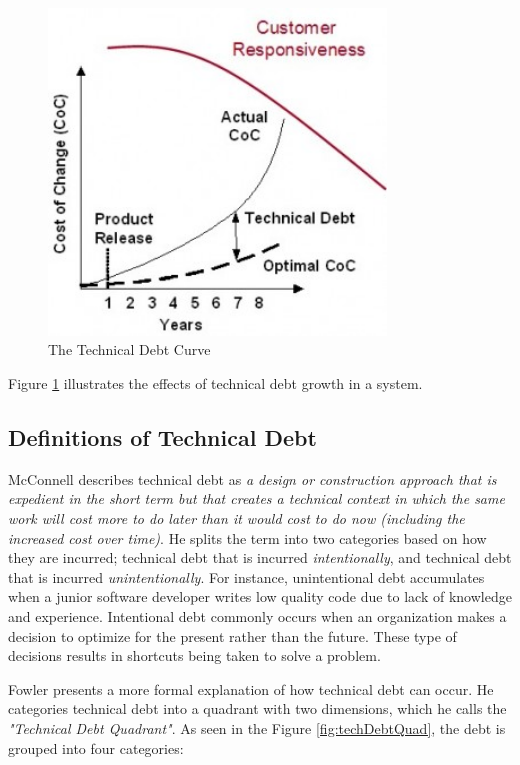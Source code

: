 \begin{figure}[ht!]
	\centering
	\includegraphics[width=0.8\textwidth]{images/techdebtCurve.jpg}
	\caption{The Technical Debt Curve\cite{jim-highsmith}}
	\label{fig:techDebtCurve}
\end{figure}

Figure \ref{fig:techDebtCurve} illustrates the effects of technical debt growth in a system.


\subsection{Definitions of Technical Debt}
McConnell\cite{url-mcconnell} describes technical debt as \textit{a design or construction approach that is expedient in the short term but that creates a technical context in which the same work will cost more to do later than it would cost to do now (including the increased cost over time)}. He splits the term into two categories based on how they are incurred; technical debt that is incurred \textit{intentionally}, and technical debt that is incurred \textit{unintentionally}. For instance, unintentional debt accumulates when a junior software developer writes low quality code due to lack of knowledge and experience. Intentional debt commonly occurs when an organization makes a decision to optimize for the present rather than the future. These type of decisions results in shortcuts being taken to solve a problem.

Fowler\cite{url-fowler} presents a more formal explanation of how technical debt can occur. He categories technical debt into a quadrant with two dimensions, which he calls the \textit{"Technical Debt Quadrant"}. As seen in the Figure \ref{fig:techDebtQuad}, the debt is grouped into four categories: 

